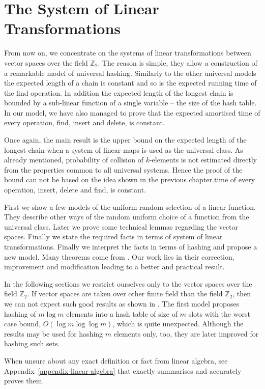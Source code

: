 \chapter{The System of Linear Transformations}
\label{chapter-linear-systems}
From now on, we concentrate on the systems of linear transformations between vector spaces over the field $\mathbb{Z}_2$. The reason is simple, they allow a construction of a remarkable model of universal hashing. Similarly to the other universal models the expected length of a chain is constant and so is the expected running time of the find operation. In addition the expected length of the longest chain is bounded by a sub-linear function of a single variable -- the size of the hash table. In our model, we have also managed to prove that the expected amortised time of every operation, find, insert and delete, is constant.

Once again, the main result is the upper bound on the expected length of the longest chain when a system of linear maps is used as the universal class. As already mentioned, probability of collision of $k$-elements is not estimated directly from the properties common to all universal systems. Hence the proof of the bound can not be based on the idea shown in the previous chapter.time of every operation, insert, delete and find, is constant.

First we show a few models of the uniform random selection of a linear function. They describe other ways of the random uniform choice of a function from the universal class. Later we prove some technical lemmas regarding the vector spaces. Finally we state the required facts in terms of  system of linear transformations. Finally we interpret the facts in terms of hashing and propose a new model. Many theorems come from \cite{DBLP:journals/jacm/AlonDMPT99}. Our work lies in their correction, improvement and modification leading to a better and practical result.

In the following sections we restrict ourselves only to the vector spaces over the field $\mathbb{Z}_2$. If vector spaces are taken over other finite field than the field $\mathbb{Z}_2$, then we can not expect such good results as shown in \cite{DBLP:journals/jacm/AlonDMPT99}. The first model proposes hashing of $m \log m$ elements into a hash table of size of $m$ slots with the worst case bound, $O(\log m \log \log m)$, which is quite unexpected. Although the results may be used for hashing $m$ elements only, too, they are later improved for hashing such sets. 

When unsure about any exact definition or fact from linear algebra, see Appendix~\ref{appendix-linear-algebra} that exactly summarises and accurately proves them.







